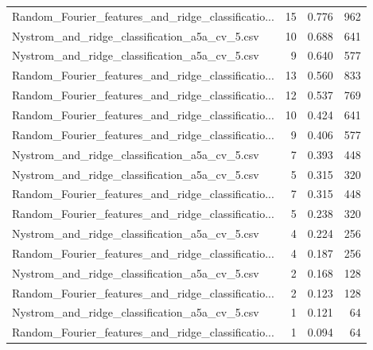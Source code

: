 \begin{tabularx}{\textwidth}{lrrr}
Random\_Fourier\_features\_and\_ridge\_classificatio... &       15 &               0.776 &           962 \\
     Nystrom\_and\_ridge\_classification\_a5a\_cv\_5.csv &       10 &               0.688 &           641 \\
     Nystrom\_and\_ridge\_classification\_a5a\_cv\_5.csv &        9 &               0.640 &           577 \\
Random\_Fourier\_features\_and\_ridge\_classificatio... &       13 &               0.560 &           833 \\
Random\_Fourier\_features\_and\_ridge\_classificatio... &       12 &               0.537 &           769 \\
Random\_Fourier\_features\_and\_ridge\_classificatio... &       10 &               0.424 &           641 \\
Random\_Fourier\_features\_and\_ridge\_classificatio... &        9 &               0.406 &           577 \\
     Nystrom\_and\_ridge\_classification\_a5a\_cv\_5.csv &        7 &               0.393 &           448 \\
     Nystrom\_and\_ridge\_classification\_a5a\_cv\_5.csv &        5 &               0.315 &           320 \\
Random\_Fourier\_features\_and\_ridge\_classificatio... &        7 &               0.315 &           448 \\
Random\_Fourier\_features\_and\_ridge\_classificatio... &        5 &               0.238 &           320 \\
     Nystrom\_and\_ridge\_classification\_a5a\_cv\_5.csv &        4 &               0.224 &           256 \\
Random\_Fourier\_features\_and\_ridge\_classificatio... &        4 &               0.187 &           256 \\
     Nystrom\_and\_ridge\_classification\_a5a\_cv\_5.csv &        2 &               0.168 &           128 \\
Random\_Fourier\_features\_and\_ridge\_classificatio... &        2 &               0.123 &           128 \\
     Nystrom\_and\_ridge\_classification\_a5a\_cv\_5.csv &        1 &               0.121 &            64 \\
Random\_Fourier\_features\_and\_ridge\_classificatio... &        1 &               0.094 &            64 \\
\bottomrule
\end{tabularx}
